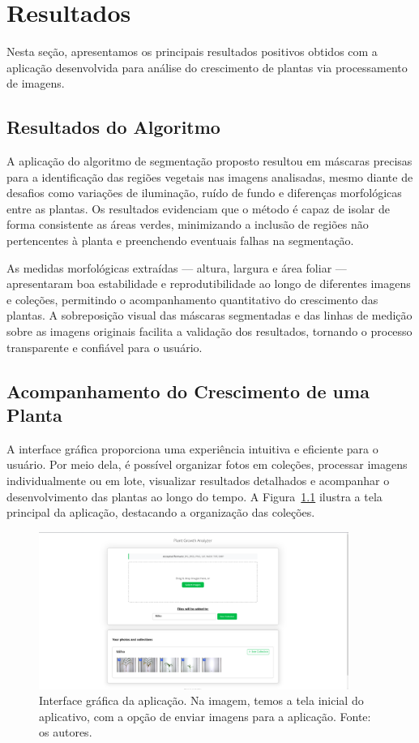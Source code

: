 \chapter{Resultados}

Nesta seção, apresentamos os principais resultados positivos obtidos com a aplicação desenvolvida para análise do crescimento de plantas via processamento de imagens.

\section{Resultados do Algoritmo}

A aplicação do algoritmo de segmentação proposto resultou em máscaras precisas para a identificação das regiões vegetais nas imagens analisadas, mesmo diante de desafios como variações de iluminação, ruído de fundo e diferenças morfológicas entre as plantas. Os resultados evidenciam que o método é capaz de isolar de forma consistente as áreas verdes, minimizando a inclusão de regiões não pertencentes à planta e preenchendo eventuais falhas na segmentação.

As medidas morfológicas extraídas --- altura, largura e área foliar --- apresentaram boa estabilidade e reprodutibilidade ao longo de diferentes imagens e coleções, permitindo o acompanhamento quantitativo do crescimento das plantas. A sobreposição visual das máscaras segmentadas e das linhas de medição sobre as imagens originais facilita a validação dos resultados, tornando o processo transparente e confiável para o usuário.

\section{Acompanhamento do Crescimento de uma Planta}

A interface gráfica proporciona uma experiência intuitiva e eficiente para o usuário. Por meio dela, é possível organizar fotos em coleções, processar imagens individualmente ou em lote, visualizar resultados detalhados e acompanhar o desenvolvimento das plantas ao longo do tempo. A Figura~\ref{fig:interface-grafica} ilustra a tela principal da aplicação, destacando a organização das coleções.

\begin{figure}[H]
    \centering
    \includegraphics[width=0.9\textwidth]{../figures/screens/interface-grafica.png}
    \caption{Interface gráfica da aplicação. Na imagem, temos a tela inicial do aplicativo, com a opção de enviar imagens para a aplicação. Fonte: os autores.}
    \label{fig:interface-grafica}
\end{figure}

